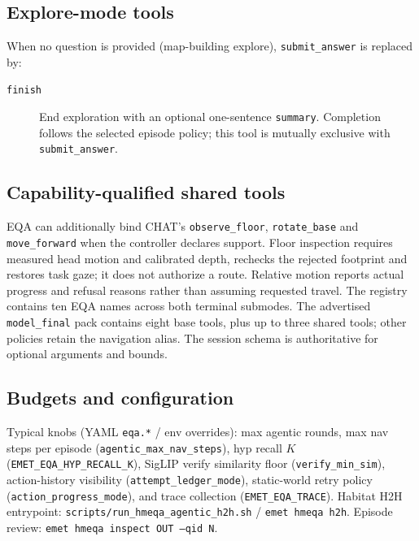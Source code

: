 \subsection{Explore-mode tools}

When no question is provided (map-building explore), \texttt{submit\_answer} is replaced by:

\begin{description}
  \item[\texttt{finish}] End exploration with an optional one-sentence \texttt{summary}.
    Completion follows the selected episode policy; this tool is mutually exclusive with \texttt{submit\_answer}.
\end{description}

\subsection{Capability-qualified shared tools}

EQA can additionally bind CHAT's \texttt{observe\_floor},
\texttt{rotate\_base} and \texttt{move\_forward} when the controller declares
support. Floor inspection requires measured head motion and calibrated depth,
rechecks the rejected footprint and restores task gaze; it does not authorize a
route. Relative motion reports actual progress and refusal reasons rather than
assuming requested travel. The registry contains ten EQA names across both
terminal submodes. The advertised \texttt{model\_final} pack contains eight base
tools, plus up to three shared tools; other policies retain the navigation alias.
The session schema is authoritative for optional arguments and bounds.

\subsection{Budgets and configuration}

Typical knobs (YAML \texttt{eqa.*} / env overrides): max agentic rounds, max nav steps per episode (\texttt{agentic\_max\_nav\_steps}), hyp recall $K$ (\texttt{EMET\_EQA\_HYP\_RECALL\_K}), SigLIP verify similarity floor (\texttt{verify\_min\_sim}), action-history visibility (\texttt{attempt\_ledger\_mode}), static-world retry policy (\texttt{action\_progress\_mode}), and trace collection (\texttt{EMET\_EQA\_TRACE}).
Habitat H2H entrypoint: \texttt{scripts/run\_hmeqa\_agentic\_h2h.sh} / \texttt{emet hmeqa h2h}.
Episode review: \texttt{emet hmeqa inspect OUT --qid N}.
